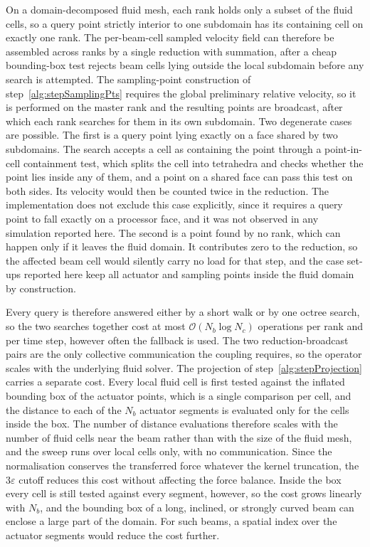 \noindent
On a domain-decomposed fluid mesh, each rank holds only a subset of the fluid cells, so a query point strictly interior to one subdomain has its containing cell on exactly one rank. The per-beam-cell sampled velocity field can therefore be assembled across ranks by a single reduction with summation, after a cheap bounding-box test rejects beam cells lying outside the local subdomain before any search is attempted. The sampling-point construction of step~\ref{alg:stepSamplingPts} requires the global preliminary relative velocity, so it is performed on the master rank and the resulting points are broadcast, after which each rank searches for them in its own subdomain. Two degenerate cases are possible. The first is a query point lying exactly on a face shared by two subdomains. The search accepts a cell as containing the point through a point-in-cell containment test, which splits the cell into tetrahedra and checks whether the point lies inside any of them, and a point on a shared face can pass this test on both sides. Its velocity would then be counted twice in the reduction. The implementation does not exclude this case explicitly, since it requires a query point to fall exactly on a processor face, and it was not observed in any simulation reported here. The second is a point found by no rank, which can happen only if it leaves the fluid domain. It contributes zero to the reduction, so the affected beam cell would silently carry no load for that step, and the case set-ups reported here keep all actuator and sampling points inside the fluid domain by construction.

\noindent
Every query is therefore answered either by a short walk or by one octree search, so the two searches together cost at most $\mathcal{O}(N_{b}\log N_{c})$ operations per rank and per time step, however often the fallback is used. The two reduction-broadcast pairs are the only collective communication the coupling requires, so the operator scales with the underlying fluid solver. The projection of step~\ref{alg:stepProjection} carries a separate cost. Every local fluid cell is first tested against the inflated bounding box of the actuator points, which is a single comparison per cell, and the distance to each of the $N_{b}$ actuator segments is evaluated only for the cells inside the box. The number of distance evaluations therefore scales with the number of fluid cells near the beam rather than with the size of the fluid mesh, and the sweep runs over local cells only, with no communication. Since the normalisation conserves the transferred force whatever the kernel truncation, the $3\varepsilon$ cutoff reduces this cost without affecting the force balance. Inside the box every cell is still tested against every segment, however, so the cost grows linearly with $N_{b}$, and the bounding box of a long, inclined, or strongly curved beam can enclose a large part of the domain. For such beams, a spatial index over the actuator segments would reduce the cost further.

